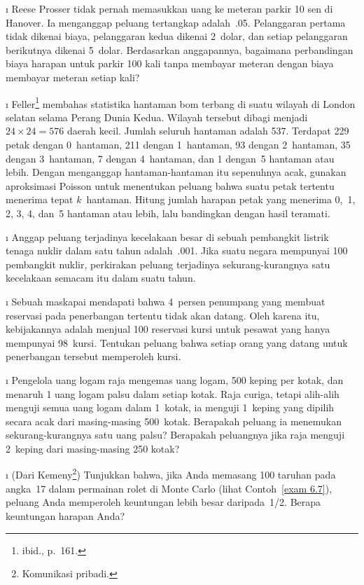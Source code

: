 \begin{LJSItem}
\i\label{exer 5.1.119} Reese Prosser tidak pernah memasukkan uang
ke meteran parkir 10 sen di Hanover. Ia menganggap peluang tertangkap adalah~.05.
Pelanggaran pertama tidak dikenai biaya, pelanggaran kedua dikenai 2~dolar, dan setiap
pelanggaran berikutnya dikenai 5~dolar. Berdasarkan anggapannya, bagaimana perbandingan
biaya harapan untuk parkir 100 kali tanpa membayar meteran dengan biaya membayar
meteran setiap kali?

\i\label{exer 9.2.15} Feller\footnote{ibid., p.~161.} membahas
statistika hantaman bom terbang di suatu wilayah di London selatan
selama Perang Dunia Kedua. Wilayah tersebut dibagi menjadi
$24 \times 24 = 576$ daerah kecil. Jumlah seluruh hantaman adalah 537. Terdapat 229
petak dengan 0~hantaman, 211 dengan 1~hantaman, 93 dengan 2~hantaman, 35 dengan
3~hantaman, 7 dengan 4~hantaman, dan 1 dengan~5 hantaman atau lebih. Dengan
menganggap hantaman-hantaman itu sepenuhnya acak, gunakan aproksimasi Poisson untuk
menentukan peluang bahwa suatu petak tertentu menerima tepat $k$~hantaman. Hitung
jumlah harapan petak yang menerima 0,~1, 2, 3, 4, dan~5 hantaman atau lebih, lalu
bandingkan dengan hasil teramati.

\i\label{exer 5.1.120} Anggap peluang terjadinya kecelakaan besar di sebuah pembangkit
listrik tenaga nuklir dalam satu tahun adalah~.001. Jika suatu negara mempunyai 100
pembangkit nuklir, perkirakan peluang terjadinya sekurang-kurangnya satu kecelakaan
semacam itu dalam suatu tahun.

\i\label{exer 5.1.121} Sebuah maskapai mendapati bahwa 4~persen penumpang yang membuat
reservasi pada penerbangan tertentu tidak akan datang. Oleh karena itu, kebijakannya
adalah menjual 100 reservasi kursi untuk pesawat yang hanya mempunyai 98~kursi.
Tentukan peluang bahwa setiap orang yang datang untuk penerbangan tersebut memperoleh
kursi.

\i\label{exer 5.1.122} Pengelola uang logam raja mengemas uang logam, 500 keping per
kotak, dan menaruh 1 uang logam palsu dalam setiap kotak. Raja curiga, tetapi alih-alih
menguji semua uang logam dalam 1~kotak, ia menguji 1~keping yang dipilih secara acak
dari masing-masing 500~kotak. Berapakah peluang ia menemukan sekurang-kurangnya satu
uang palsu? Berapakah peluangnya jika raja menguji 2~keping dari masing-masing
250 kotak?

\i\label{exer 5.1.123} (Dari Kemeny\footnote{Komunikasi pribadi.}) Tunjukkan bahwa,
jika Anda memasang 100 taruhan pada angka~17 dalam permainan rolet di Monte Carlo
(lihat Contoh~\ref{exam 6.7}), peluang Anda memperoleh keuntungan lebih besar
daripada~1/2. Berapa keuntungan harapan Anda?


\end{LJSItem}
